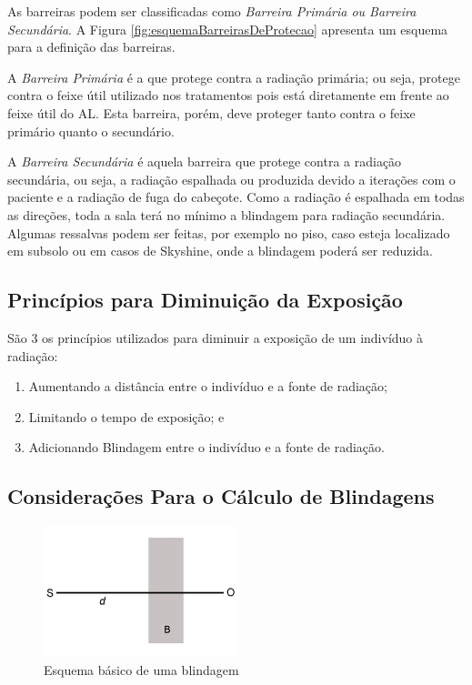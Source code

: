 \documentclass[11pt,a4paper]{article}
\newcounter{exemplo}
\begin{document}
            As barreiras podem ser classificadas como \textit{Barreira Primária ou Barreira Secundária}. A Figura \ref{fig:esquemaBarreirasDeProtecao} apresenta um esquema para a definição das barreiras.

            A \textit{\textcolor{CarnationPink}{Barreira Primária}} é a que protege contra a radiação primária; ou seja, protege contra o feixe útil utilizado nos tratamentos pois está diretamente em frente ao feixe útil do AL. Esta barreira, porém, deve proteger tanto contra o feixe primário quanto o secundário.

            A {\textit{\textcolor{CarnationPink}{Barreira Secundária}}} é aquela barreira que protege contra a radiação secundária, ou seja, a radiação espalhada ou produzida devido a iterações com o paciente e a radiação de fuga do cabeçote. Como a radiação é espalhada em todas as direções, toda a sala terá no mínimo a blindagem para radiação secundária. Algumas ressalvas podem ser feitas, por exemplo no piso, caso esteja localizado em subsolo ou em casos de Skyshine, onde a blindagem poderá ser reduzida.
        
        
        \subsection{Princípios para Diminuição da Exposição}
            
            São 3 os princípios utilizados para diminuir a exposição de um indivíduo à radiação:

            \begin{enumerate}
                \item Aumentando a distância entre o indivíduo e a fonte de radiação;
                \item Limitando o tempo de exposição; e
                \item Adicionando Blindagem entre o indivíduo e a fonte de radiação.
            \end{enumerate}
        
        \subsection{Considerações Para o Cálculo de Blindagens}

        \begin{figure}
            \centering
            \includegraphics[width=0.5\textwidth]{Imagens/esquemaBasicoDeBlindagem.jpg}
            \caption{Esquema básico de uma blindagem}
            \label{fig:esquemaBasicoDeBlindagem}
        \end{figure}
\end{document}
